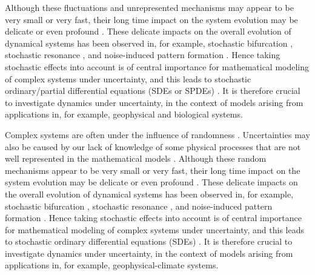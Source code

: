 \documentclass[11pt]{article}
\begin{document}
Although these fluctuations and  unrepresented     mechanisms  may appear to be very small or very fast, their long time
impact on the system evolution may be delicate or even profound \cite{Arnold, DuanBook2}. These
delicate impacts on the overall evolution of dynamical  systems has
been observed in, for example, stochastic bifurcation
\cite{Crauel, CarLanRob01, Horst}, stochastic resonance \cite{Imkeller},
 and  noise-induced pattern formation \cite{Gar, BlomkerStani}.
Hence taking stochastic effects   into account is of
central importance for   mathematical modeling of
complex systems under uncertainty, and this leads to stochastic ordinary/partial  differential equations (SDEs or SPDEs)     \cite{Arnold, Ikeda, Oksendal, WaymireDuan}. It is therefore crucial to investigate dynamics under uncertainty, in the  context of   models arising from applications in, for example, geophysical and biological systems.


 Complex systems
  are often under the influence  of randomness  \cite{Moss1, Horst, Gar, VanKampen3}.  Uncertainties may also be caused by our lack of knowledge of some
  physical processes  that are    not well represented  in the mathematical models
\cite{Palmer1, ChenDuan, Kantz, Wilks, Williams}.
Although these random     mechanisms    appear to be very small or very fast, their long time
impact on the system evolution may be delicate or even profound \cite{Arnold, DuanBook2015}. These
delicate impacts on the overall evolution of dynamical  systems has
been observed in, for example, stochastic bifurcation
\cite{Crauel, CarLanRob01, Horst}, stochastic resonance \cite{imkeller2002model},
 and  noise-induced pattern formation \cite{Gar, blomker2003pattern}.
Hence taking stochastic effects   into account is of
central importance for   mathematical modeling of
complex systems under uncertainty, and this leads to stochastic ordinary  differential equations (SDEs)     \cite{Arnold, Ikeda, Okse2003, WaymireDuan}. It is therefore crucial to investigate dynamics under uncertainty, in the  context of   models arising from applications in, for example, geophysical-climate   systems.
\end{document}
